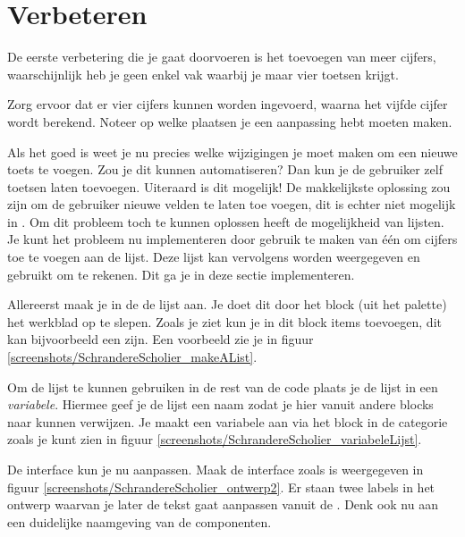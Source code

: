 \section{Verbeteren}
De eerste verbetering die je gaat doorvoeren is het toevoegen van meer cijfers, waarschijnlijk heb je geen enkel vak waarbij je maar vier toetsen krijgt. 

 \begin{opgave}
    \opgVraag
Zorg ervoor dat er vier cijfers kunnen worden ingevoerd, waarna het vijfde cijfer wordt berekend. Noteer op welke plaatsen je een aanpassing hebt moeten maken.
\end{opgave}

Als het goed is weet je nu precies welke wijzigingen je moet maken om een nieuwe toets te voegen. Zou je dit kunnen automatiseren? Dan kun je de gebruiker zelf toetsen laten toevoegen. Uiteraard is dit mogelijk! De makkelijkste oplossing zou zijn om de gebruiker nieuwe velden te laten toe voegen, dit is echter niet mogelijk in \ai. Om dit probleem toch te kunnen oplossen heeft \ai de mogelijkheid van lijsten. Je kunt het probleem nu implementeren door gebruik te maken van \'e\'en  om cijfers toe te voegen aan de lijst. Deze lijst kan vervolgens worden weergegeven en gebruikt om te rekenen. Dit ga je in deze sectie implementeren.

Allereerst maak je in de  de lijst aan. Je doet dit door het  block (uit het  palette) het werkblad op te slepen. Zoals je ziet kun je in dit block items toevoegen, dit kan bijvoorbeeld een  zijn. Een voorbeeld zie je in figuur \ref{screenshots/SchrandereScholier_makeAList}.

Om de lijst te kunnen gebruiken in de rest van de code plaats je de lijst in een \emph{variabele}. Hiermee geef je de lijst een naam zodat je hier vanuit andere blocks naar kunnen verwijzen. Je maakt een variabele aan via het  block in de categorie  zoals je kunt zien in figuur \ref{screenshots/SchrandereScholier_variabeleLijst}. 

 \begin{opgave}
    \opgVraag
De interface kun je nu aanpassen. Maak de interface zoals is weergegeven in figuur \ref{screenshots/SchrandereScholier_ontwerp2}. Er staan twee labels in het ontwerp waarvan je later de tekst gaat aanpassen vanuit de . Denk ook nu aan een duidelijke naamgeving van de componenten.
\end{opgave}

